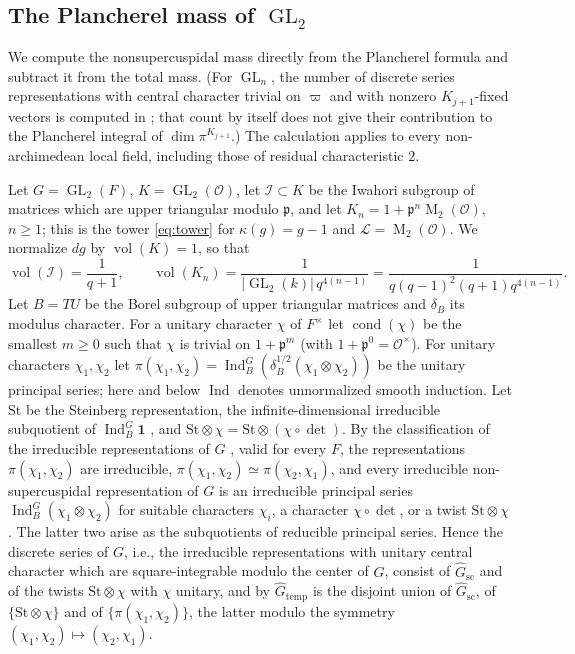 \documentclass[11pt,reqno]{amsart}
\numberwithin{equation}{section}
\theoremstyle{plain}
\theoremstyle{definition}
\theoremstyle{remark}
\theoremstyle{plain}
\newcommand{\OO}{\mathcal{O}}    %
\newcommand{\pp}{\mathfrak{p}}   %
\newcommand{\Lat}{\mathcal{L}}   %
\newcommand{\g}{\mathfrak{g}}    %
\newcommand{\Gsc}{\widehat{G}_{\mathrm{sc}}}    %
\newcommand{\Gtemp}{\widehat{G}_{\mathrm{temp}}} %
\newcommand{\St}{\mathrm{St}}                   %
\newcommand{\Iw}{\mathcal{I}}                   %
\newcommand{\one}{\mathbf{1}}
\newcommand{\abs}[1]{\lvert#1\rvert}
\DeclareMathOperator{\vol}{vol}
\DeclareMathOperator{\GL}{GL}
\DeclareMathOperator{\Mat}{M}
\DeclareMathOperator{\Ind}{Ind}
\DeclareMathOperator{\cond}{cond}   %
\begin{document}
\subsection{The Plancherel mass of \texorpdfstring{$\GL_2$}{GL2}}\label{sec:gl2exact}

We compute the nonsupercuspidal mass directly from the Plancherel
formula and subtract it from the total mass. (For $\GL_n$, the number of
discrete series representations with central character trivial on $\varpi$
and with nonzero $K_{j+1}$-fixed vectors is computed in
\cite[Theorem~1]{MR2303528}; that count by itself does not give their
contribution to the Plancherel integral of $\dim\pi^{K_{j+1}}$.) The calculation applies
to every non-archimedean local field, including those of residual
characteristic $2$.

Let $G=\GL_2(F)$, $K=\GL_2(\OO)$, let $\Iw\subset K$ be the Iwahori
subgroup of matrices which are upper triangular modulo $\pp$, and
let $K_n=1+\pp^n\Mat_2(\OO)$, $n\ge1$; this is the tower
\eqref{eq:tower} for $\kappa(g)=g-1$ and $\Lat=\Mat_2(\OO)$. We
normalize $dg$ by $\vol(K)=1$, so that
\begin{equation}\label{eq:volumes}
\vol(\Iw)=\frac1{q+1},\qquad
\vol(K_n)=\frac1{\abs{\GL_2(k)}\,q^{4(n-1)}}
=\frac1{q(q-1)^2(q+1)q^{4(n-1)}}.
\end{equation}
Let $B=TU$ be the Borel subgroup of upper triangular matrices and
$\delta_B$ its modulus character. For a unitary character $\chi$ of
$F^\times$ let $\cond(\chi)$ be the smallest $m\ge0$ such that $\chi$ is
trivial on $1+\pp^m$ (with $1+\pp^0=\OO^\times$). For
unitary characters $\chi_1,\chi_2$ let
$\pi(\chi_1,\chi_2)=\Ind_B^G(\delta_B^{1/2}(\chi_1\otimes\chi_2))$ be
the unitary principal series; here and below $\Ind$ denotes
unnormalized smooth induction. Let $\St$ be the Steinberg representation,
the infinite-dimensional irreducible subquotient of $\Ind_B^G\one$
\cite[(9.10.3)]{MR2234120}, and
$\St\otimes\chi=\St\otimes(\chi\circ\det)$. By the classification of
the irreducible representations of $G$ \cite[9.11~Lemma and Classification Theorem]{MR2234120}, valid
for every $F$, the representations $\pi(\chi_1,\chi_2)$ are irreducible,
$\pi(\chi_1,\chi_2)\simeq\pi(\chi_2,\chi_1)$, and every irreducible
non-supercuspidal representation of $G$ is an irreducible principal
series $\Ind_B^G(\chi_1\otimes\chi_2)$ for suitable characters $\chi_i$,
a character $\chi\circ\det$, or a twist $\St\otimes\chi$. The latter two
arise as the subquotients of reducible principal series. Hence
the discrete series of $G$, i.e., the irreducible representations with
unitary central character which are square-integrable modulo the center
of $G$, consist of $\Gsc$ and of the twists
$\St\otimes\chi$ with $\chi$ unitary, and by
\cite[Proposition~III.4.1]{MR1989693} $\Gtemp$ is the disjoint union of
$\Gsc$, of $\{\St\otimes\chi\}$ and of $\{\pi(\chi_1,\chi_2)\}$, the
latter modulo the symmetry $(\chi_1,\chi_2)\mapsto(\chi_2,\chi_1)$.
\end{document}
